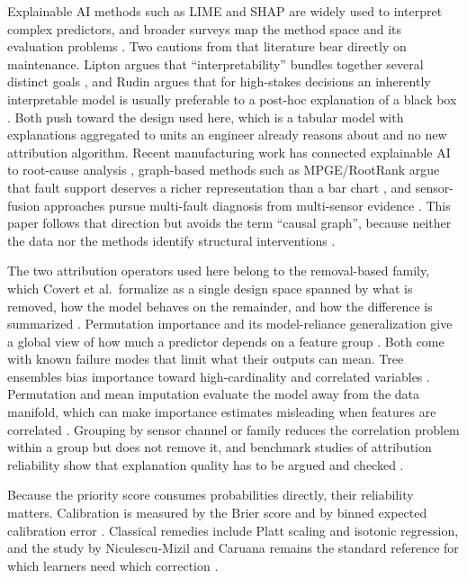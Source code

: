 \documentclass[journal]{IEEEtran}
\begin{document}
Explainable AI methods such as LIME \cite{Ribeiro2016LIME} and SHAP
\cite{Lundberg2017SHAP} are widely used to interpret complex predictors, and
broader surveys map the method space and its evaluation problems
\cite{Adadi2018Survey,Molnar2022IML,DoshiVelez2017Rigorous}. Two cautions from that
literature bear directly on maintenance. Lipton argues that ``interpretability''
bundles together several distinct goals \cite{Lipton2018Mythos}, and Rudin argues
that for high-stakes decisions an inherently interpretable model is usually
preferable to a post-hoc explanation of a black box \cite{Rudin2019StopExplaining}.
Both push toward the design used here, which is a tabular model with explanations
aggregated to units an engineer already reasons about and no new attribution
algorithm. Recent manufacturing work has connected explainable AI to root-cause
analysis \cite{CIRP2024XAIRCA}, graph-based methods such as MPGE/RootRank argue
that fault support deserves a richer representation than a bar chart
\cite{Deng2023RootRank}, and sensor-fusion approaches pursue multi-fault diagnosis
from multi-sensor evidence \cite{XAI2024RotatingPdM}. This paper follows that
direction but avoids the term ``causal graph'', because neither the data nor the
methods identify structural interventions \cite{Pearl2009Causality}.

The two attribution operators used here belong to the removal-based family, which
Covert et al.\ formalize as a single design space spanned by what is removed, how
the model behaves on the remainder, and how the difference is summarized
\cite{Covert2021RemovalBased}. Permutation importance and its model-reliance
generalization give a global view of how much a predictor depends on a feature
group \cite{Fisher2019ModelReliance,Strumbelj2014Explaining}. Both come with known
failure modes that limit what their outputs can mean. Tree ensembles bias importance toward high-cardinality and
correlated variables \cite{Strobl2007Bias}. Permutation and mean imputation evaluate
the model away from the data manifold, which can make importance estimates
misleading when features are correlated \cite{Hooker2021Unrestricted}. Grouping by
sensor channel or family reduces the correlation problem within a group but does
not remove it, and benchmark studies of attribution reliability show that
explanation quality has to be argued and checked \cite{Hooker2019ROAR}.

Because the priority score consumes probabilities directly, their reliability
matters. Calibration is measured by the Brier score \cite{Brier1950Verification}
and by binned expected calibration error
\cite{Naeini2015BayesianBinning,Guo2017Calibration}. Classical remedies include
Platt scaling \cite{Platt1999Probabilistic} and isotonic regression, and the study by
Niculescu-Mizil and Caruana remains the standard reference for which learners need
which correction \cite{NiculescuMizil2005Predicting}.
\end{document}
